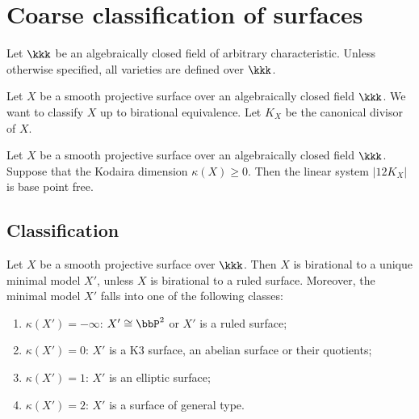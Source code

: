 \section{Coarse classification of surfaces}

Let \(\kkk\) be an algebraically closed field of arbitrary characteristic.
Unless otherwise specified, all varieties are defined over \(\kkk\).

Let \(X\) be a smooth projective surface over an algebraically closed field \(\kkk\). 
We want to classify \(X\) up to birational equivalence.
Let \(K_X\) be the canonical divisor of \(X\).


    \begin{theorem}\label{thm:12K_is_base_point_free_on_surfaces_with_nonnegative_kodaira_dimension}
        Let \(X\) be a smooth projective surface over an algebraically closed field \(\kkk\).
        Suppose that the Kodaira dimension \(\kappa(X)\geq 0\).
        Then the linear system \(|12K_X|\) is base point free.
    \end{theorem}

\subsection{Classification}

    \begin{theorem}\label{thm:enriques_kodaira_classification}
        Let \(X\) be a smooth projective surface over \(\kkk\).
        Then \(X\) is birational to a unique minimal model \(X'\), unless \(X\) is birational to a ruled surface.
        Moreover, the minimal model \(X'\) falls into one of the following classes:
        \begin{enumerate}
            \item \(\kappa(X')=-\infty\): \(X'\cong \bbP^2\) or \(X'\) is a ruled surface;
            \item \(\kappa(X')=0\): \(X'\) is a K3 surface, an abelian surface or their quotients;
            \item \(\kappa(X')=1\): \(X'\) is an elliptic surface;
            \item \(\kappa(X')=2\): \(X'\) is a surface of general type.
        \end{enumerate}
    \end{theorem}
